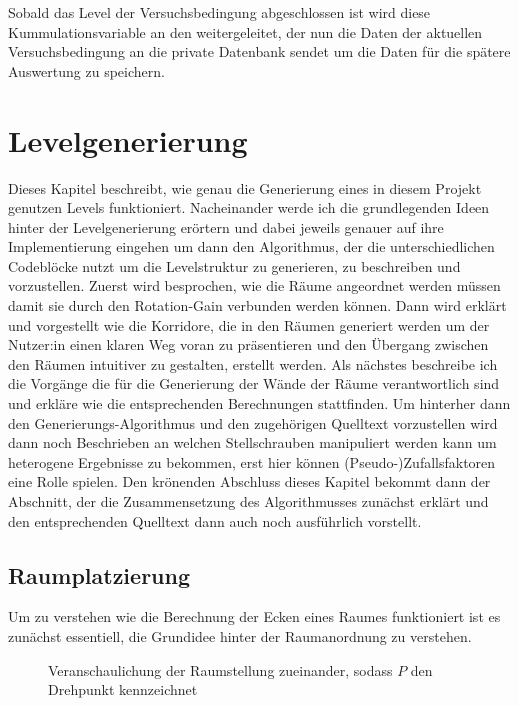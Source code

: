 Sobald das Level der Versuchsbedingung abgeschlossen ist wird diese Kummulationsvariable an den  weitergeleitet, der nun die Daten der aktuellen Versuchsbedingung an die private Datenbank sendet um die Daten für die spätere Auswertung zu speichern.

\chapter{Levelgenerierung}
\label{section:generate}
Dieses Kapitel beschreibt, wie genau die Generierung eines in diesem Projekt genutzen Levels funktioniert. Nacheinander werde ich die grundlegenden Ideen hinter der Levelgenerierung erörtern und dabei jeweils genauer auf ihre Implementierung eingehen um dann den Algorithmus, der die unterschiedlichen Codeblöcke nutzt um die Levelstruktur zu generieren, zu beschreiben und vorzustellen.
Zuerst wird besprochen, wie die Räume angeordnet werden müssen damit sie durch den Rotation-Gain verbunden werden können. Dann wird erklärt und vorgestellt wie die Korridore, die in den Räumen generiert werden um der Nutzer:in einen klaren Weg voran zu präsentieren und den Übergang zwischen den Räumen intuitiver zu gestalten, erstellt werden. Als nächstes beschreibe ich die Vorgänge die für die Generierung der Wände der Räume verantwortlich sind und erkläre wie die entsprechenden Berechnungen stattfinden.
Um hinterher dann den Generierungs-Algorithmus und den zugehörigen Quelltext vorzustellen wird dann noch Beschrieben an welchen Stellschrauben manipuliert werden kann um heterogene Ergebnisse zu bekommen, erst hier können (Pseudo-)Zufallsfaktoren eine Rolle spielen.
Den krönenden Abschluss dieses Kapitel bekommt dann der Abschnitt,
der die Zusammensetzung des Algorithmusses zunächst erklärt und den entsprechenden Quelltext dann auch noch ausführlich vorstellt.

\section{Raumplatzierung}

Um zu verstehen wie die Berechnung der Ecken eines Raumes funktioniert ist es zunächst essentiell, die Grundidee hinter der Raumanordnung zu verstehen.

\begin{figure}[H]
    \caption{Veranschaulichung der Raumstellung zueinander, sodass $P$ den Drehpunkt kennzeichnet }\label{figure:two_rooms} %
\end{figure}

